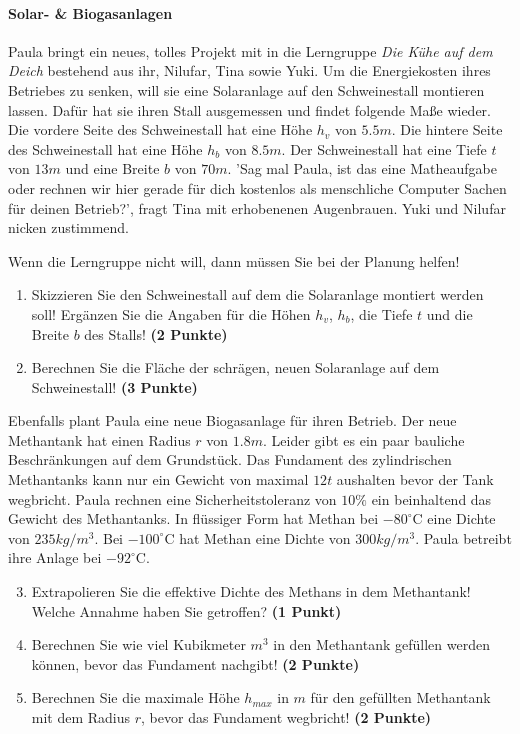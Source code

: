 \documentclass[a4paper, 9pt]{scrartcl}\usepackage[]{graphicx}\usepackage[]{xcolor}
\begin{document}
\paragraph{Solar- \& Biogasanlagen}



Paula bringt ein neues, tolles Projekt mit in die Lerngruppe \textit{Die Kühe auf dem Deich} bestehend aus ihr, Nilufar, Tina sowie Yuki. Um die Energiekosten ihres Betriebes zu senken, will sie eine Solaranlage auf den Schweinestall montieren lassen. Dafür hat sie ihren Stall ausgemessen und findet folgende Maße wieder. Die vordere Seite des Schweinestall hat eine Höhe $h_v$ von $5.5m$. Die hintere Seite des Schweinestall hat eine Höhe $h_b$ von $8.5m$. Der Schweinestall hat eine Tiefe $t$ von $13m$ und eine Breite $b$ von $70m$. 'Sag mal Paula, ist das eine Matheaufgabe oder rechnen wir hier gerade für dich kostenlos als menschliche Computer Sachen für deinen Betrieb?', fragt Tina mit erhobenenen Augenbrauen. Yuki und Nilufar nicken zustimmend.

\vspace{1Ex}

Wenn die Lerngruppe nicht will, dann müssen Sie bei der Planung helfen!

\begin{enumerate}
\item Skizzieren Sie den Schweinestall auf dem die Solaranlage montiert werden soll! Ergänzen Sie die Angaben für die Höhen $h_v$, $h_b$, die Tiefe $t$ und die Breite $b$ des Stalls!  \textbf{(2 Punkte)}
\item Berechnen Sie die Fläche der schrägen, neuen Solaranlage auf dem Schweinestall! \textbf{(3 Punkte)}
\end{enumerate}

Ebenfalls plant Paula eine neue Biogasanlage für ihren Betrieb. Der neue Methantank hat einen Radius $r$ von $1.8m$. Leider gibt es ein paar bauliche Beschränkungen auf dem Grundstück. Das Fundament des zylindrischen Methantanks kann nur ein Gewicht von maximal $12t$ aushalten bevor der Tank wegbricht. Paula rechnen eine Sicherheitstoleranz von $10\%$ ein beinhaltend das Gewicht des Methantanks. In flüssiger Form hat Methan bei $-80^\circ\text{C}$ eine Dichte von $235kg/m^3$. Bei $-100^\circ\text{C}$ hat Methan eine Dichte von $300kg/m^3$. Paula betreibt ihre Anlage bei $-92^\circ\text{C}$.

\begin{enumerate}
  \setcounter{enumi}{2}
\item Extrapolieren Sie die effektive Dichte des Methans in dem Methantank! Welche Annahme haben Sie getroffen? \textbf{(1 Punkt)}
\item Berechnen Sie wie viel Kubikmeter $m^3$ in den Methantank gefüllen werden können, bevor das Fundament nachgibt! \textbf{(2 Punkte)}
\item Berechnen Sie die maximale Höhe $h_{max}$ in $m$ für den gefüllten Methantank mit dem Radius $r$, bevor das Fundament wegbricht! \textbf{(2 Punkte)}
\end{enumerate}
\end{document}

